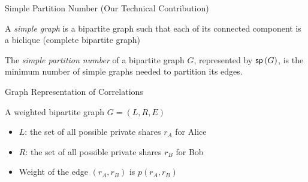 \begin{frame}{Simple Partition Number (Our Technical Contribution)}
	\begin{definition}
		A \textit{simple graph} is a bipartite graph such that each of its
		connected component is a biclique (complete bipartite graph)
	\end{definition}
	\pause
	\begin{definition}
		The \textit{simple partition number} of a bipartite graph $G$, represented
		by $\sp G$, is the minimum number of simple graphs needed to
		partition its edges.
	\end{definition}
	\pause
	
\end{frame}
\begin{frame}{Graph Representation of Correlations}
	\begin{definition}
		A weighted bipartite graph $  G = (L, R, E) $
		\begin{itemize}
	  		\item $ L $: the set of all possible private shares $ r_A $ for Alice
	  		\item $ R $: the set of all possible private shares $ r_B $ for Bob
			\item Weight of the edge $ (r_A, r_B) $ is  $ p(r_A, r_B) $
		\end{itemize}
	\end{definition}
	
\end{frame}

